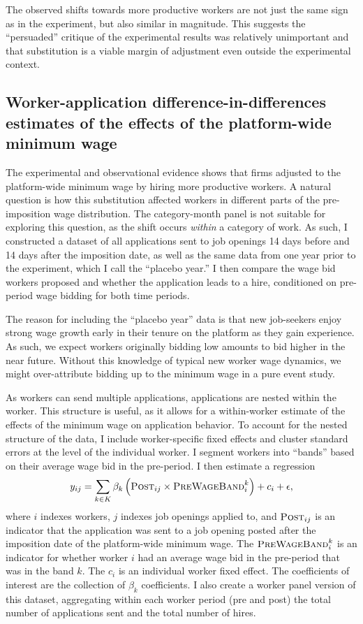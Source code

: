\documentclass[AER]{AEA}
\begin{document}
The observed shifts towards more productive workers are not just the same sign as in the experiment, but also similar in magnitude.
This suggests the ``persuaded'' critique of the experimental results was relatively unimportant and that substitution is a viable margin of adjustment even outside the experimental context. 

\subsection{Worker-application difference-in-differences estimates of the effects of the platform-wide minimum wage}

The experimental and observational evidence shows that firms adjusted to the platform-wide minimum wage by hiring more productive workers. 
A natural question is how this substitution affected workers in different parts of the pre-imposition wage distribution.
The category-month panel is not suitable for exploring this question, as the shift occurs \emph{within} a category of work.
As such, I constructed a dataset of all applications sent to job openings 14 days before and 14 days after the imposition date, as well as the same data from one year prior to the experiment, which I call the ``placebo year.''
I then compare the wage bid workers proposed and whether the application leads to a hire, conditioned on pre-period wage bidding for both time periods. 

The reason for including the ``placebo year'' data is that new job-seekers enjoy strong wage growth early in their tenure on the platform as they gain experience.
As such, we expect workers originally bidding low amounts to bid higher in the near future.
Without this knowledge of typical new worker wage dynamics, we might over-attribute bidding up to the minimum wage in a pure event study.

As workers can send multiple applications, applications are nested within the worker.
This structure is useful, as it allows for a within-worker estimate of the effects of the minimum wage on application behavior.   
To account for the nested structure of the data, I include worker-specific fixed effects and cluster standard errors at the level of the individual worker. 
I segment workers into  ``bands'' based on their average wage bid in the pre-period.  
I then estimate a regression  
\begin{align} \label{eq:application_level}
y_{ij} = \sum_{k \in K} \beta_k \left( \textsc{Post}_{ij} \times \textsc{PreWageBand}^k_{i} \right) + c_i + \epsilon,
\end{align}
where $i$ indexes workers, $j$ indexes job openings applied to, and $\textsc{Post}_{ij}$ is an indicator that the application was sent to a job opening posted after the imposition date of the platform-wide minimum wage. 
The $\textsc{PreWageBand}^k_i$ is an indicator for whether worker $i$ had an average wage bid in the pre-period that was in the band $k$. 
The $c_i$ is an individual worker fixed effect. 
The coefficients of interest are the collection of $\beta_k$ coefficients.
I also create a worker panel version of this dataset, aggregating within each worker period (pre and post) the total number of applications sent and the total number of hires.   
\end{document}
